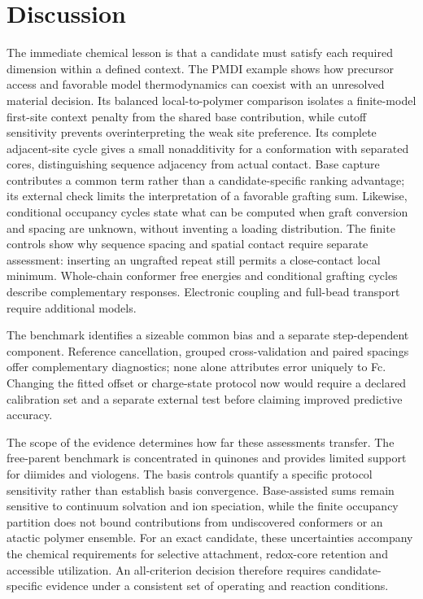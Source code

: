 \documentclass[11pt]{article}
\begin{document}
\section{Discussion}
The immediate chemical lesson is that a candidate must satisfy each required dimension within a defined context. The PMDI example shows how precursor access and favorable model thermodynamics can coexist with an unresolved material decision. Its balanced local-to-polymer comparison isolates a finite-model first-site context penalty from the shared base contribution, while cutoff sensitivity prevents overinterpreting the weak site preference. Its complete adjacent-site cycle gives a small nonadditivity for a conformation with separated cores, distinguishing sequence adjacency from actual contact. Base capture contributes a common term rather than a candidate-specific ranking advantage; its external check limits the interpretation of a favorable grafting sum. Likewise, conditional occupancy cycles state what can be computed when graft conversion and spacing are unknown, without inventing a loading distribution. The finite controls show why sequence spacing and spatial contact require separate assessment: inserting an ungrafted repeat still permits a close-contact local minimum. Whole-chain conformer free energies and conditional grafting cycles describe complementary responses. Electronic coupling and full-bead transport require additional models.

The benchmark identifies a sizeable common bias and a separate step-dependent component. Reference cancellation, grouped cross-validation and paired spacings offer complementary diagnostics; none alone attributes error uniquely to Fc. Changing the fitted offset or charge-state protocol now would require a declared calibration set and a separate external test before claiming improved predictive accuracy.

The scope of the evidence determines how far these assessments transfer. The free-parent benchmark is concentrated in quinones and provides limited support for diimides and viologens. The basis controls quantify a specific protocol sensitivity rather than establish basis convergence. Base-assisted sums remain sensitive to continuum solvation and ion speciation, while the finite occupancy partition does not bound contributions from undiscovered conformers or an atactic polymer ensemble. For an exact candidate, these uncertainties accompany the chemical requirements for selective attachment, redox-core retention and accessible utilization. An all-criterion decision therefore requires candidate-specific evidence under a consistent set of operating and reaction conditions.
\end{document}
